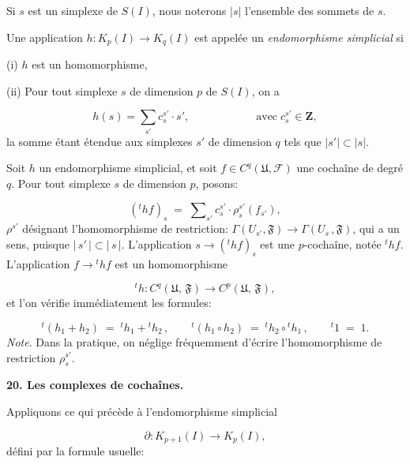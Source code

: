 Si $s$ est un simplexe de $S(I)$, nous noterons $| s |$ l'ensemble des sommets de $s$.

Une application $h : K_p(I) \to K_q(I)$ est appelée un \textit{endomorphisme simplicial} si

(i) $h$ est un homomorphisme,

(ii) Pour tout simplexe $s$ de dimension $p$ de $S(I)$, on a

\begin{equation*}
h(s) = \sum_{s'} c_s^{s'} \cdot s', \qquad\qquad\qquad \mathrm{avec}\; c_s^{s'} \in \mathbf{Z} ,
\end{equation*}
la somme étant étendue aux simplexes $s'$ de dimension $q$ tels que $| s' | \subset | s |$.

Soit $h$ un endomorphisme simplicial, et soit $f \in C^q(\mathfrak{U}, \mathcal{F})$ une cochaîne de
degré $q$. Pour tout simplexe $s$ de dimension $p$, posons:

\begin{equation*}
({}^{t}hf)_{s} \;=\; \sum\nolimits_{s'} c_{s}^{s'} \cdot \rho_{s}^{s'}(f_{s'}),
\end{equation*}
$\rho^{s'}$ désignant l'homomorphisme de restriction: $\Gamma(U_{s'}, \mathfrak{F}) \to \Gamma(U_{s}\,, \mathfrak{F})$, qui a un sens, puisque $|\,s'\,| \subset |\,s\,|$. L'application $s \to ({}^{t}hf)_{s}$ est une $p$-cochaîne, notée ${}^{t}hf$. L'application $f \to {}^{t}hf$ est un homomorphisme

\begin{equation*}
{}^{t}h : C^{q}(\mathfrak{U},\, \mathfrak{F}) \to C^{p}(\mathfrak{U},\, \mathfrak{F}),
\end{equation*}
et l'on vérifie immédiatement les formules:

\begin{equation*}
{}^{t}(h_{1} + h_{2}) \;=\; {}^{t}h_{1} + {}^{t}h_{2}\,, \qquad {}^{t}(h_{1} \circ h_{2}) \;=\; {}^{t}h_{2} \circ {}^{t}h_{1}\,, \qquad {}^{t}1 \;=\; 1.
\end{equation*}
\textit{Note}. Dans la pratique, on néglige fréquemment d'écrire l'homomorphisme de restriction $\rho_{s}^{s'}$.


\textbf{20. Les complexes de cochaînes.}

Appliquons ce qui précède à l'endomorphisme simplicial

\begin{equation*}
\partial : K_{p+1}(I) \to K_{p}(I),
\end{equation*}
défini par la formule usuelle:

